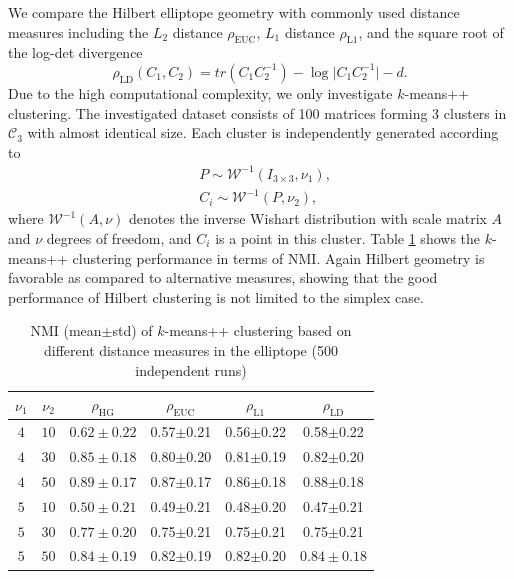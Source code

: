 \documentclass[graybox]{svmult}
\begin{document}
We compare the Hilbert elliptope geometry with commonly used distance measures
including the $L_2$ distance $\rho_{\mathrm{EUC}}$, $L_1$ distance $\rho_{\mathrm{L1}}$,
and the square root of the log-det divergence
$$
\rho_{\mathrm{LD}}(C_1,C_2) = tr(C_1C_2^{-1}) - \log\vert{}C_1C_2^{-1}\vert - d.
$$
Due to the high computational complexity, we only investigate $k$-means++ clustering.
The investigated dataset consists of 100 matrices forming 3 clusters in $\mathcal{C}_3$ with
almost identical size.  Each cluster is independently generated according to
\begin{align}
&P\sim \mathcal{W}^{-1}(I_{3\times{3}}, \nu_1),\nonumber\\
&C_i\sim \mathcal{W}^{-1}(P,\nu_2),\nonumber
\end{align}
where $\mathcal{W}^{-1}(A,\nu)$ denotes the inverse Wishart distribution with
scale matrix $A$ and $\nu$ degrees of freedom, and $C_i$ is a point in this cluster.
Table \ref{tbl:elliptope} shows the $k$-means++ clustering performance in terms of NMI.
Again Hilbert geometry is favorable as compared to alternative measures, showing
that the good performance of Hilbert clustering is not limited to the simplex case.
\begin{table}[t]
\centering
\caption{NMI (mean$\pm$std) of $k$-means++ clustering based on different distance measures in the elliptope
(500 independent runs)}
\label{tbl:elliptope}
\begin{tabular}{cc|cccc}
\toprule[1.5pt]
$\nu_1$ & $\nu_2$    &  $\rho_{\mathrm{HG}}$ & $\rho_{\mathrm{EUC}}$ & $\rho_{\mathrm{L1}}$ & $\rho_{\mathrm{LD}}$ \\
\hline
$4$ & $10$ &  $\bm{0.62\pm0.22}$ & 0.57$\pm$0.21 & 0.56$\pm$0.22 & 0.58$\pm$0.22\\
$4$ & $30$ &  $\bm{0.85\pm0.18}$ & 0.80$\pm$0.20 & 0.81$\pm$0.19 & 0.82$\pm$0.20\\
$4$ & $50$ &  $\bm{0.89\pm0.17}$ & 0.87$\pm$0.17 & 0.86$\pm$0.18 & 0.88$\pm$0.18\\
\hline
$5$ & $10$ &  $\bm{0.50\pm0.21}$ & 0.49$\pm$0.21 & 0.48$\pm$0.20 & 0.47$\pm$0.21\\
$5$ & $30$ &  $\bm{0.77\pm0.20}$ & 0.75$\pm$0.21 & 0.75$\pm$0.21 & 0.75$\pm$0.21\\
$5$ & $50$ &  $\bm{0.84\pm0.19}$ & 0.82$\pm$0.19 & 0.82$\pm$0.20 & $\bm{0.84\pm0.18}$\\
\bottomrule[1.5pt]
\end{tabular}
\end{table}
\end{document}
